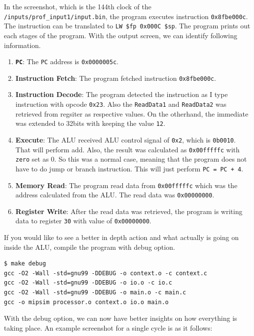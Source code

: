 \documentclass{homework}
\begin{document}
In the screenshot, which is the 144th clock of the \texttt{/inputs/prof_input1/input.bin}, the program executes instruction \texttt{0x8fbe000c}. The instruction can be translated to \texttt{LW \$fp 0x000C \$sp}. The program prints out each stages of the program. With the output screen, we can identify following information.
\begin{enumerate}
    \item \textbf{\texttt{PC}}: The \texttt{PC} address is \texttt{0x0000005c}.
    \item \textbf{Instruction Fetch}: The program fetched instruction \texttt{0x8fbe000c}. 
    \item \textbf{Instruction Decode}: The program detected the instruction as I type instruction with opcode \texttt{0x23}. Also the \texttt{ReadData1} and \texttt{ReadData2} was retrieved from regsiter as respective values. On the otherhand, the immediate was extended to 32bits with keeping the value \texttt{12}.
    \item \textbf{Execute}: The ALU received ALU control signal of \texttt{0x2}, which is \texttt{0b0010}. That will perform add. Also, the result was calculated as \texttt{0x00fffffc} with \texttt{zero} set as 0. So this was a normal case, meaning that the program does not have to do jump or branch instruction. This will just perform \texttt{PC = PC + 4}.
    \item \textbf{Memory Read}: The program read data from \texttt{0x00fffffc} which was the address calculated from the ALU. The read data was \texttt{0x00000000}.
    \item \textbf{Register Write}: After the read data was retrieved, the program is writing data to register \texttt{30} with value of \texttt{0x00000000}.
\end{enumerate}
If you would like to see a better in depth action and what actually is going on inside the ALU, compile the program with debug option. 
\\
\begin{center}
\begin{code}
\begin{verbatim}
$ make debug
gcc -O2 -Wall -std=gnu99 -DDEBUG -o context.o -c context.c
gcc -O2 -Wall -std=gnu99 -DDEBUG -o io.o -c io.c
gcc -O2 -Wall -std=gnu99 -DDEBUG -o main.o -c main.c
gcc -o mipsim processor.o context.o io.o main.o
\end{verbatim}
\end{code}
\end{center}
With the debug option, we can now have better insights on how everything is taking place. An example screenshot for a single cycle is as it follows:
\end{document}
